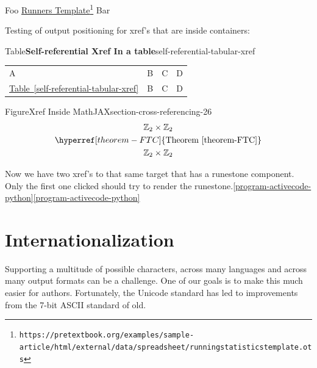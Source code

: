 \documentclass[pdflatex]{sn-jnl}
\theoremstyle{thmstyleone}%
\theoremstyle{thmstyletwo}%
\theoremstyle{thmstylethree}%
\newcommand{\tabularfont}{\relax}
\newcommand{\xreffont}{\relax}
\numberwithin{equation}{section}
\newcommand{\hrulemedium}{\noalign{\hrule height 0.07em}}
\begin{document}
\par
Foo \href{https://pretextbook.org/examples/sample-article/html/external/data/spreadsheet/runningstatisticstemplate.ots}{Runners Template}\footnote{\nolinkurl{https://pretextbook.org/examples/sample-article/html/external/data/spreadsheet/runningstatisticstemplate.ots}\label{section-cross-referencing-23-2}} Bar%
\par
Testing of output positioning for xref's that are inside containers:%
\begin{tableptx}{Table}{\textbf{Self-referential Xref In a table}}{self-referential-tabular-xref}{}%
\centering%
{\tabularfont%
\begin{tabular}{llll}
A&B&C&D\tabularnewline\hrulemedium
\hyperref[self-referential-tabular-xref]{Table~{\xreffont\ref{self-referential-tabular-xref}}}&B&C&D
\end{tabular}
}%
\end{tableptx}%
\begin{figureptx}{Figure}{Xref Inside MathJAX}{section-cross-referencing-26}{}%
\centering
%
\begin{gather*}
{\mathbb Z}_2 \times {\mathbb Z}_2\\
\hyperref[theorem-FTC]{\text{Theorem {\xreffont\ref{theorem-FTC}}}}\\
{\mathbb Z}_2 \times {\mathbb Z}_2
\end{gather*}
%
\tcblower
\end{figureptx}%
Now we have two xref's to that same target that has a runestone component. Only the first one clicked should try to render the runestone.\hyperref[program-activecode-python]{{\xreffont\ref{program-activecode-python}}}\hyperref[program-activecode-python]{{\xreffont\ref{program-activecode-python}}}%
%
%
\typeout{************************************************}
\typeout{************************************************}
%
\section{Internationalization}\label{section-internationalization}%
%
Supporting a multitude of possible characters, across many languages and across many output formats can be a challenge.  One of our goals is to make this much easier for authors.  Fortunately, the Unicode standard has led to improvements from the 7-bit ASCII standard of old.%
\end{document}
